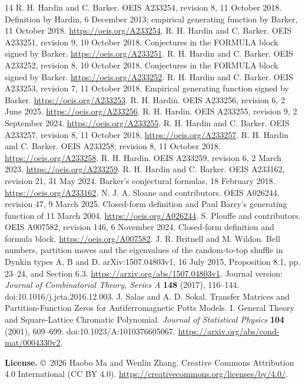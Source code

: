 \documentclass[11pt]{article}
\begin{document}
{\small
\begin{thebibliography}{14}
\setlength{\itemsep}{2pt}
 R. H. Hardin and C. Barker.
OEIS A233254, revision 8, 11 October 2018.
Definition by Hardin, 6 December 2013; empirical generating function
by Barker, 11 October 2018.
\url{https://oeis.org/A233254}.
 R. H. Hardin and C. Barker.
OEIS A233251, revision 9, 10 October 2018.
Conjectures in the FORMULA block signed by Barker.
\url{https://oeis.org/A233251}.
 R. H. Hardin and C. Barker.
OEIS A233252, revision 8, 10 October 2018.
Conjectures in the FORMULA block signed by Barker.
\url{https://oeis.org/A233252}.
 R. H. Hardin and C. Barker.
OEIS A233253, revision 7, 11 October 2018.
Empirical generating function signed by Barker.
\url{https://oeis.org/A233253}.
 R. H. Hardin.
OEIS A233256, revision 6, 2 June 2025.
\url{https://oeis.org/A233256}.
 R. H. Hardin. OEIS A233255, revision 9, 2 September 2024.
\url{https://oeis.org/A233255}.
 R. H. Hardin and C. Barker.
OEIS A233257, revision 8, 11 October 2018.
\url{https://oeis.org/A233257}.
 R. H. Hardin and C. Barker.
OEIS A233258, revision 8, 11 October 2018.
\url{https://oeis.org/A233258}.
 R. H. Hardin. OEIS A233259, revision 6, 2 March 2023.
\url{https://oeis.org/A233259}.
 R. H. Hardin and C. Barker. OEIS A233162,
revision 21, 31 May 2024. Barker's conjectural formulas, 18 February 2018.
\url{https://oeis.org/A233162}.
 N. J. A. Sloane and contributors. OEIS A026244,
revision 47, 9 March 2025. Closed-form definition and Paul Barry's
generating function of 11 March 2004. \url{https://oeis.org/A026244}.
 S. Plouffe and contributors. OEIS A007582,
revision 146, 6 November 2024. Closed-form definition and formula block.
\url{https://oeis.org/A007582}.
 J. R. Britnell and M. Wildon.
Bell numbers, partition moves and the eigenvalues of the random-to-top
shuffle in Dynkin types A, B and D. arXiv:1507.04803v1, 16 July 2015,
Proposition 8.1, pp. 23--24, and Section 6.3.
\url{https://arxiv.org/abs/1507.04803v1}.
Journal version: \emph{Journal of Combinatorial Theory, Series A}
\textbf{148} (2017), 116--144. doi:10.1016/j.jcta.2016.12.003.
 J. Salas and A. D. Sokal.
Transfer Matrices and Partition-Function Zeros for Antiferromagnetic
Potts Models. I. General Theory and Square-Lattice Chromatic Polynomial.
\emph{Journal of Statistical Physics} \textbf{104} (2001), 609--699.
doi:10.1023/A:1010376605067.
\url{https://arxiv.org/abs/cond-mat/0004330v2}.
\end{thebibliography}
}
\medskip\noindent
\textbf{License.} \copyright\ 2026 Haobo Ma and Wenlin Zhang.
Creative Commons Attribution 4.0 International (CC BY 4.0).
\url{https://creativecommons.org/licenses/by/4.0/}.
\end{document}
